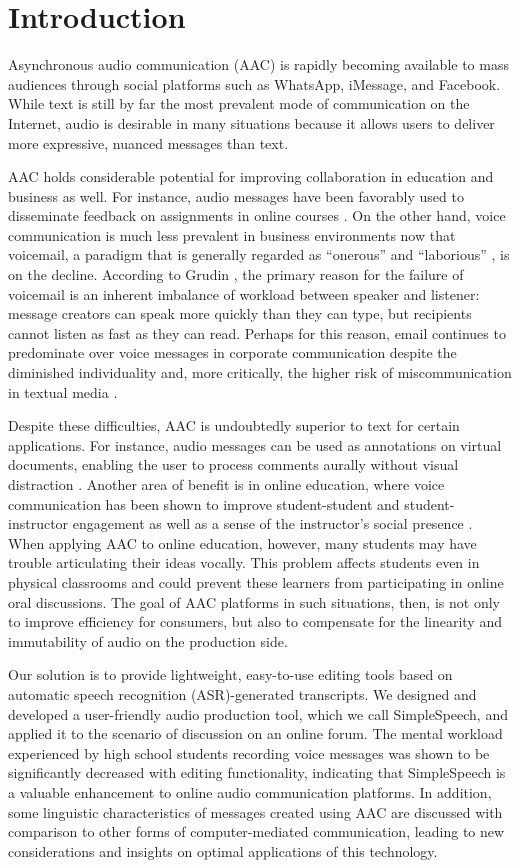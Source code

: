 \section{Introduction}

Asynchronous audio communication (AAC) is rapidly becoming available to mass audiences through social platforms such as WhatsApp, iMessage, and Facebook. 
While text is still by far the most prevalent mode of communication on the Internet, audio is desirable in many situations because it allows users to deliver more expressive, nuanced messages than text.

AAC holds considerable potential for improving collaboration in education and business as well. 
For instance, audio messages have been favorably used to disseminate feedback on assignments in online courses \cite{ice,oomen}. 
On the other hand, voice communication is much less prevalent in business environments now that voicemail, a paradigm that is generally regarded as ``onerous'' and ``laborious'' \cite{whittaker}, is on the decline. 
According to Grudin \cite{grudin}, the primary reason for the failure of voicemail is an inherent imbalance of workload between speaker and listener: message creators can speak more quickly than they can type, but recipients cannot listen as fast as they can read. 
Perhaps for this reason, email continues to predominate over voice messages in corporate communication despite the diminished individuality and, more critically, the higher risk of miscommunication in textual media \cite{byron}.

Despite these difficulties, AAC is undoubtedly superior to text for certain applications. 
For instance, audio messages can be used as annotations on virtual documents, enabling the user to process comments aurally without visual distraction \cite{yoon}.
Another area of benefit is in online education, where voice communication has been shown to improve student-student and student-instructor engagement as well as a sense of the instructor's social presence \cite{oomen,tu}. 
When applying AAC to online education, however, many students may have trouble articulating their ideas vocally.
This problem affects students even in physical classrooms and could prevent these learners from participating in online oral discussions.
The goal of AAC platforms in such situations, then, is not only to improve efficiency for consumers, but also to compensate for the linearity and immutability of audio on the production side.

Our solution is to provide lightweight, easy-to-use editing tools based on automatic speech recognition (ASR)-generated transcripts.
We designed and developed a user-friendly audio production tool, which we call SimpleSpeech, and applied it to the scenario of discussion on an online forum. 
The mental workload experienced by high school students recording voice messages was shown to be significantly decreased with editing functionality, indicating that SimpleSpeech is a valuable enhancement to online audio communication platforms.
In addition, some linguistic characteristics of messages created using AAC are discussed with comparison to other forms of computer-mediated communication, leading to new considerations and insights on optimal applications of this technology.